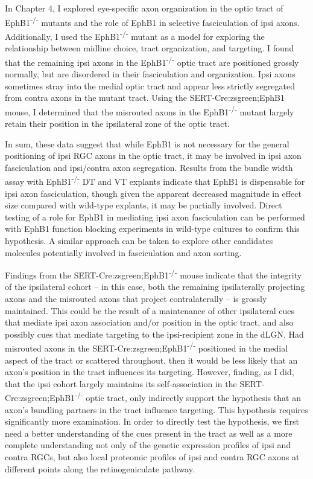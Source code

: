 In Chapter 4, I explored eye-specific axon organization in the optic tract of EphB1\textsuperscript{-/-} mutants and the role of EphB1 in selective fasciculation of ipsi axons.
Additionally, I used the EphB1\textsuperscript{-/-} mutant as a model for exploring the relationship between midline choice, tract organization, and targeting.
I found that the remaining ipsi axons in the EphB1\textsuperscript{-/-} optic tract are positioned grossly normally, but are disordered in their fasciculation and organization.
Ipsi axons sometimes stray into the medial optic tract and appear less strictly segregated from contra axons in the mutant tract.
Using the SERT-Cre:zsgreen;EphB1 mouse, I determined that the misrouted axons in the EphB1\textsuperscript{-/-} mutant largely retain their position in the ipsilateral zone of the optic tract.

In sum, these data suggest that while EphB1 is not necessary for the general positioning of ipsi RGC axons in the optic tract, it may be involved in ipsi axon fasciculation and ipsi/contra axon segregation.
Results from the bundle width assay with EphB1\textsuperscript{-/-} DT and VT explants indicate that EphB1 is dispensable for ipsi axon fasciculation, though given the apparent decreased magnitude in effect size compared with wild-type explants, it may be partially involved.
Direct testing of a role for EphB1 in mediating ipsi axon fasciculation can be performed with EphB1 function blocking experiments in wild-type cultures to confirm this hypothesis.
A similar approach can be taken to explore other candidates molecules potentially involved in fasciculation and axon sorting.

Findings from the SERT-Cre:zsgreen;EphB1\textsuperscript{-/-} mouse indicate that the integrity of the ipsilateral cohort -- in this case, both the remaining ipsilaterally projecting axons and the misrouted axons that project contralaterally -- is grossly maintained.
This could be the result of a maintenance of other ipsilateral cues that mediate ipsi axon association and/or position in the optic tract, and also possibly cues that mediate targeting to the ipsi-recipient zone in the dLGN.
Had misrouted axons in the SERT-Cre:zsgreen;EphB1\textsuperscript{-/-} positioned in the medial aspect of the tract or scattered throughout, then it would be less likely that an axon's position in the tract influences its targeting.
However, finding, as I did, that the ipsi cohort largely maintains its self-association in the SERT-Cre:zsgreen;EphB1\textsuperscript{-/-} optic tract, only indirectly support the hypothesis that an axon's bundling partners in the tract influence targeting.
This hypothesis requires significantly more examination.
In order to directly test the hypothesis, we first need a better understanding of the cues present in the tract as well as a more complete understanding not only of the genetic expression profiles of ipsi and contra RGCs, but also local proteomic profiles of ipsi and contra RGC axons at different points along the retinogeniculate pathway.

